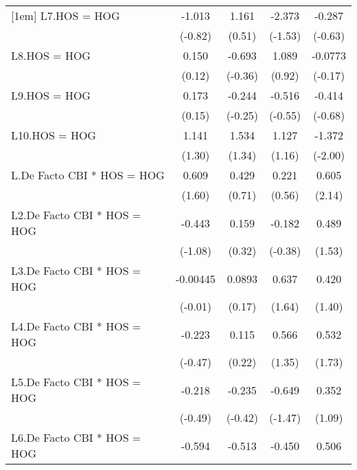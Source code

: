 {\begin{longtable}{l*{4}{c}}
[1em]
L7.HOS = HOG    &   -1.013         &    1.161         &   -2.373         &   -0.287         \\
                &  (-0.82)         &   (0.51)         &  (-1.53)         &  (-0.63)         \\
[1em]
L8.HOS = HOG    &    0.150         &   -0.693         &    1.089         &  -0.0773         \\
                &   (0.12)         &  (-0.36)         &   (0.92)         &  (-0.17)         \\
[1em]
L9.HOS = HOG    &    0.173         &   -0.244         &   -0.516         &   -0.414         \\
                &   (0.15)         &  (-0.25)         &  (-0.55)         &  (-0.68)         \\
[1em]
L10.HOS = HOG   &    1.141         &    1.534         &    1.127         &   -1.372\sym{*}  \\
                &   (1.30)         &   (1.34)         &   (1.16)         &  (-2.00)         \\
[1em]
L.De Facto CBI * HOS = HOG&    0.609         &    0.429         &    0.221         &    0.605\sym{*}  \\
                &   (1.60)         &   (0.71)         &   (0.56)         &   (2.14)         \\
[1em]
L2.De Facto CBI * HOS = HOG&   -0.443         &    0.159         &   -0.182         &    0.489         \\
                &  (-1.08)         &   (0.32)         &  (-0.38)         &   (1.53)         \\
[1em]
L3.De Facto CBI * HOS = HOG& -0.00445         &   0.0893         &    0.637         &    0.420         \\
                &  (-0.01)         &   (0.17)         &   (1.64)         &   (1.40)         \\
[1em]
L4.De Facto CBI * HOS = HOG&   -0.223         &    0.115         &    0.566         &    0.532         \\
                &  (-0.47)         &   (0.22)         &   (1.35)         &   (1.73)         \\
[1em]
L5.De Facto CBI * HOS = HOG&   -0.218         &   -0.235         &   -0.649         &    0.352         \\
                &  (-0.49)         &  (-0.42)         &  (-1.47)         &   (1.09)         \\
[1em]
L6.De Facto CBI * HOS = HOG&   -0.594         &   -0.513         &   -0.450         &    0.506         \\

\end{longtable}}
